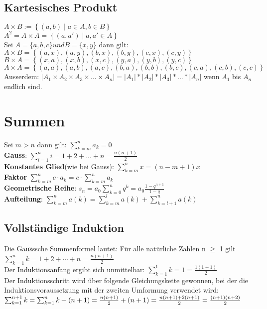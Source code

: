 \documentclass[11pt]{article}
\begin{document}
\subsection{Kartesisches Produkt}
$A \times B := \left\{ (a, b) \mid a \in A, b \in B \right\}$ \\
$A^2 = A \times A = \left\{ (a, a') \mid a, a' \in A \right\}$ \\
Sei $A=\{ a, b, c \} und B=\{ x, y \}$ dann gilt: \\
$A \times B = \left\{ (a,x), (a,y), (b,x), (b,y), (c,x), (c,y) \right\}$ \\
$B \times A = \left\{ (x,a), (x,b), (x,c), (y,a), (y,b), (y,c) \right\}$ \\
$A \times A = \left\{ (a,a), (a,b), (a,c), (b,a), (b,b), (b,c), (c,a), (c,b), (c,c) \right\}$\\
Ausserdem: $\mathopen| A_1 \times A_2 \times A_3 \times ... \times A_n \mathclose| = \mathopen|A_1\mathclose|*\mathopen|A_2\mathclose|*\mathopen|A_3\mathclose|*...*\mathopen|A_n\mathclose|$ wenn $A_1$ bis $A_n$ endlich sind.

\section{Summen}
Sei $m>n$ dann gilt: $\sum_{k=m}^{n}a_k = 0$\\
{\bfseries Gauss}: $\sum_{i=1}^n{i} = 1+2+...+n = \frac{n(n+1)}{2}$ \\
{\bfseries Konstantes Glied}(wie bei Gauss): $\sum_{k=m}^{n}x = (n-m+1)x$ \\
{\bfseries Faktor} $\sum_{k=m}^{n}c\cdot a_k = c\cdot \sum_{k=m}^{n}a_k$ \\
{\bfseries Geometrische Reihe}: $s_n=a_0\sum_{k=0}^{n} q^k = a_0\frac{1-q^{n+1}}{1-q}$ \\
{\bfseries Aufteilung}: $\sum_{k=m}^n a(k) = \sum_{k=m}^l a(k) + \sum_{k=l+1}^n a(k)$

\subsection{Vollst{\"a}ndige Induktion}
Die Gau{\"ss}sche Summenformel lautet: F{\"u}r alle nat{\"u}rliche Zahlen n $\geq$ 1 gilt
$\sum^n_{k=1} k = 1+2+\cdots+n = \frac{n(n+1)}{2}$\\
Der Induktionsanfang ergibt sich unmittelbar: $\sum^1_{k=1} k = 1 = \frac{1(1+1)}{2}$ \\
Der Induktionsschritt wird {\"u}ber folgende Gleichungskette gewonnen, bei der die Induktionsvoraussetzung mit der zweiten Umformung verwendet wird: $\sum^{n+1}_{k=1} k = \sum^n_{k=1} k + (n+1) = \frac{n(n+1)}{2}+(n+1)\\ =\frac{n(n+1)+2(n+1)}{2} = \frac{(n+1)(n+2)}{2}$
\end{document}
